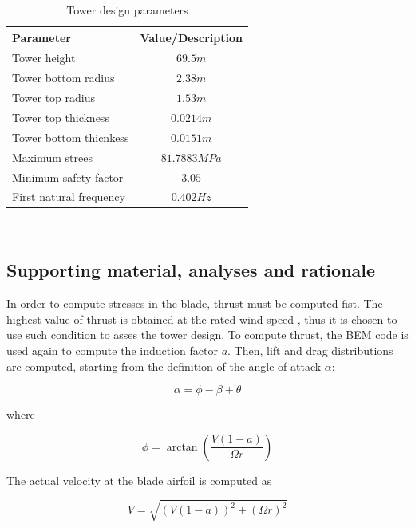 \begin{table}[H]
\begin{center} 
\caption{Tower design parameters}\label{tab:tower}
\begin{tabular}{ |l|c| } 
\hline
\textbf{Parameter} & \textbf{Value/Description}  \\ 
\hline
Tower height & $69.5 m$ \\ 
\hline
Tower bottom radius & $2.38 m$ \\ 
\hline
Tower top radius & $1.53 m$ \\
\hline
Tower top thickness & $0.0214 m$ \\
\hline
Tower bottom thicnkess & $0.0151 m$ \\
\hline
Maximum strees & $81.7883 MPa$ \\
\hline
Minimum safety factor & $3.05$ \\
\hline
First natural frequency & $0.402 Hz$ \\
\hline
\end{tabular} \\
\end{center}
\end{table}

\subsection{Supporting material, analyses and rationale}

In order to compute stresses in the blade, thrust must be computed fist. The highest value of thrust is obtained at the rated wind speed \cite{hau}, thus it is chosen to use such condition to asses the tower design. 
To compute thrust, the BEM code is used again to compute the induction factor $a$. Then, lift and drag distributions are computed, starting from the definition of the angle of attack $\alpha$:

\begin{equation}
    \alpha = \phi - \beta + \theta 
\end{equation}

where

\begin{equation}
    \phi = \arctan\left(\frac{V(1 - a)}{ \Omega r}\right)
\end{equation}

The actual velocity at the blade airfoil is computed as

\begin{equation}
    V = \sqrt{ (V ( 1 - a )) ^ 2 + ( \Omega r ) ^ 2}
\end{equation}

